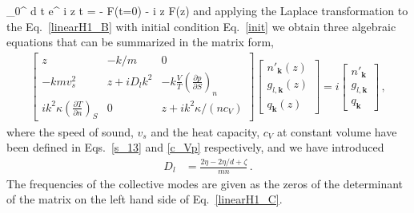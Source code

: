 \be\label{Laplace1}
\int_0^{\infty} d t e^{ i z t} = 
- F(t=0) - i z F(z)
\ee 
and applying the Laplace transformation to the Eq.~\eqref{linearH1_B} with initial condition Eq.~\eqref{init} %
we obtain three algebraic equations that can be summarized in the matrix form,
\begin{align}\label{linearH1_C}
\begin{bmatrix}
z & - k/m & 0 \\
-k m v_s^2 & z    + i D_l k^2 & -k \frac{V}{T} \left( \frac{\partial p}{\partial S} \right)_n\\
i k^2 \kappa  \left( \frac{\partial T}{\partial n} \right)_S & 0 & z  + i k^2  \kappa / (n c_V)  
\end{bmatrix}
\begin{bmatrix}
n'_{\bm{k}}(z) \\
g_{l,\bm{k}}(z)  \\
q_{\bm{k}}(z)
\end{bmatrix}
= i
\begin{bmatrix}
n'_{\bm{k}} \\
g_{l,\bm{k}} \\
q_{\bm{k}}
\end{bmatrix}\, ,
\end{align}
where the speed of sound, $v_s$ and the heat capacity, $c_V$ at constant volume have been defined in Eqs.~\eqref{s_13} and \eqref{c_Vp} respectively, and we have introduced  
\begin{align}
D_l & = \frac{2\eta -2\eta / d + \zeta}{ mn }\, .
\end{align}
The frequencies of the collective modes are given as the zeros of the determinant of the matrix on the left hand side of Eq.~\eqref{linearH1_C}.
